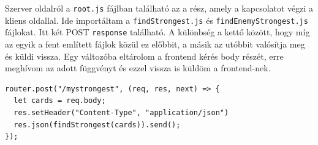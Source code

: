 Szerver oldalról a \texttt{root.js} fájlban található az a rész, amely a kapcsolatot végzi a kliens oldallal. Ide importáltam a \texttt{findStrongest.js} és \texttt{findEnemyStrongest.js} fájlokat. Itt két POST \texttt{response} található. A különbség a kettő között, hogy míg az egyik a fent említett fájlok közül ez előbbit, a másik az utóbbit valósítja meg és küldi vissza. Egy változóba eltárolom a frontend kérés body részét, erre meghívom az adott függvényt és ezzel vissza is küldöm a frontend-nek.

\begin{lstlisting}[style=htmlcssjs]
router.post("/mystrongest", (req, res, next) => {
  let cards = req.body;
  res.setHeader("Content-Type", "application/json")
  res.json(findStrongest(cards)).send();
});
\end{lstlisting}